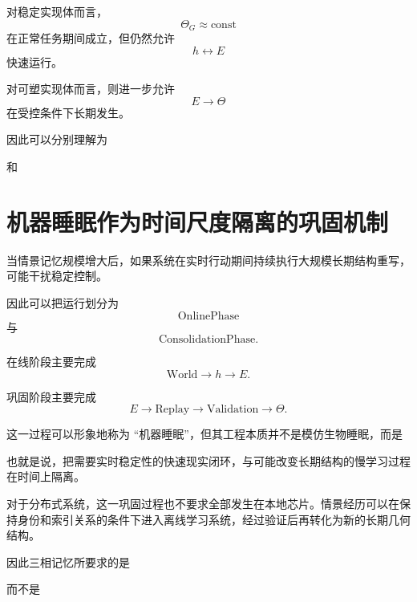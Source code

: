 对稳定实现体而言，
\[
\Theta_G\approx\mathrm{const}
\]
在正常任务期间成立，但仍然允许
\[
h
\leftrightarrow
E
\]
快速运行。

对可塑实现体而言，则进一步允许
\[
E\rightarrow\Theta
\]
在受控条件下长期发生。

因此可以分别理解为
\begin{statementbox}
\centering
{}
\end{statementbox}
和
\begin{statementbox}
\centering
{}
\end{statementbox}

\section{机器睡眠作为时间尺度隔离的巩固机制}

当情景记忆规模增大后，如果系统在实时行动期间持续执行大规模长期结构重写，可能干扰稳定控制。

因此可以把运行划分为
\[
\mathrm{OnlinePhase}
\]
与
\[
\mathrm{ConsolidationPhase}.
\]

在线阶段主要完成
\[
\mathrm{World}
\rightarrow
h
\rightarrow
E.
\]

巩固阶段主要完成
\[
E
\rightarrow
\mathrm{Replay}
\rightarrow
\mathrm{Validation}
\rightarrow
\Theta.
\]

这一过程可以形象地称为 ``机器睡眠''，但其工程本质并不是模仿生物睡眠，而是
\begin{statementbox}
\centering
{}
\end{statementbox}

也就是说，把需要实时稳定性的快速现实闭环，与可能改变长期结构的慢学习过程在时间上隔离。

对于分布式系统，这一巩固过程也不要求全部发生在本地芯片。情景经历可以在保持身份和索引关系的条件下进入离线学习系统，经过验证后再转化为新的长期几何结构。

因此三相记忆所要求的是
\begin{statementbox}
\centering
{}
\end{statementbox}
而不是
\begin{statementbox}
\centering
{}
\end{statementbox}

